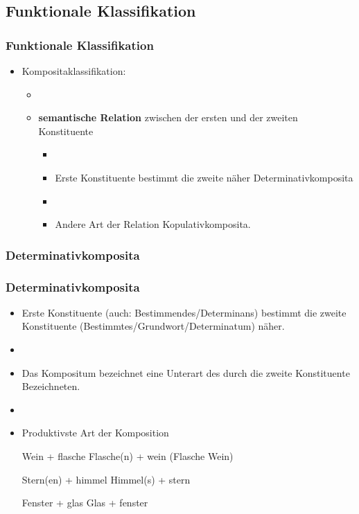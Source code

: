 \subsection{Funktionale Klassifikation}


\begin{frame}
\frametitle{Funktionale Klassifikation}

\begin{itemize}
	\item Kompositaklassifikation:
	
	\begin{itemize}
		\item[]		
		\item \textbf{semantische Relation} zwischen der ersten und der zweiten Konstituente
		
		\begin{itemize}
			\item[]
			\item Erste Konstituente bestimmt die zweite näher \ras Determinativkomposita
			\item[]
			\item Andere Art der Relation \ras Kopulativkomposita.
		\end{itemize}
	\end{itemize}
\end{itemize}


\end{frame}


\subsubsection{Determinativkomposita}


\begin{frame}
\frametitle{Determinativkomposita}

\begin{itemize}
	\item Erste Konstituente (auch: Bestimmendes/Determinans) bestimmt die zweite Konstituente (Bestimmtes/Grundwort/Determinatum) näher.
	\item[]
	\item Das Kompositum bezeichnet eine Unterart des durch die zweite Konstituente Bezeichneten.
	\item[]
	\item Produktivste Art der Komposition
	
	\ea Wein + flasche \vs Flasche(n) + wein (Flasche \vs Wein)
	\z
	
	\ea Stern(en) + himmel \vs Himmel(s) + stern
	\z
		
	\ea Fenster + glas \vs Glas + fenster
	\z
	
\end{itemize}

\end{frame}

